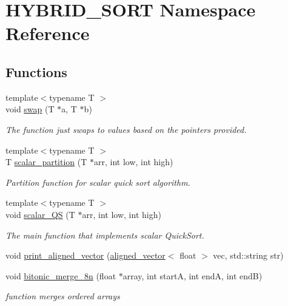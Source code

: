 \hypertarget{namespaceHYBRID__SORT}{}\section{H\+Y\+B\+R\+I\+D\+\_\+\+S\+O\+RT Namespace Reference}
\label{namespaceHYBRID__SORT}
\subsection*{Functions}
\begin{DoxyCompactItemize}
\item 
{\footnotesize template$<$typename T $>$ }\\void \mbox{\hyperlink{namespaceHYBRID__SORT_ac7b73df60799b21d3451aa838627d881}{swap}} (T $\ast$a, T $\ast$b)
\begin{DoxyCompactList}\small\item\em The function just swaps to values based on the pointers provided. \end{DoxyCompactList}\item 
{\footnotesize template$<$typename T $>$ }\\T \mbox{\hyperlink{namespaceHYBRID__SORT_a368e263837d7996212a20d788d9e85ac}{scalar\+\_\+partition}} (T $\ast$arr, int low, int high)
\begin{DoxyCompactList}\small\item\em Partition function for scalar quick sort algorithm. \end{DoxyCompactList}\item 
{\footnotesize template$<$typename T $>$ }\\void \mbox{\hyperlink{namespaceHYBRID__SORT_a70cac879f3750d9b5213463f07a4a1b1}{scalar\+\_\+\+QS}} (T $\ast$arr, int low, int high)
\begin{DoxyCompactList}\small\item\em The main function that implements scalar Quick\+Sort. \end{DoxyCompactList}\item 
void \mbox{\hyperlink{namespaceHYBRID__SORT_aa822314eab01e2f91b0131e98fbd638b}{print\+\_\+aligned\+\_\+vector}} (\mbox{\hyperlink{type__definitions_8hpp_a087efd587d66b881646ef378f1919c90}{aligned\+\_\+vector}}$<$ float $>$ vec, std\+::string str)
\item 
void \mbox{\hyperlink{namespaceHYBRID__SORT_a5f76d2e085c5ce3b1aac2200c1f42b7b}{bitonic\+\_\+merge\+\_\+8n}} (float $\ast$array, int startA, int endA, int endB)
\begin{DoxyCompactList}\small\item\em function merges ordered arrays \end{DoxyCompactList}\item 

\end{DoxyCompactItemize}
